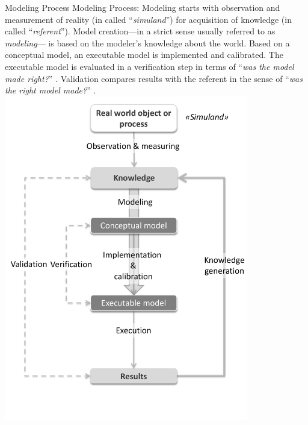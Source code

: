 \createfigure%
{Modeling Process}%
{Modeling Process: Modeling starts with observation and measurement of reality (in \citet[][]{Petty_SokolowskiBanks_2010} called ``\emph{simuland}'') for acquisition of knowledge (in \citet[][]{Petty_SokolowskiBanks_2010} called ``\emph{referent}''). Model creation---in a strict sense usually referred to as \emph{modeling}--- is based on the modeler's knowledge about the world. Based on a conceptual model, an executable model is implemented and calibrated. The executable model is evaluated in a verification step in terms of ``\emph{was the model made right?}'' \citep[][p.332]{Petty_SokolowskiBanks_2010}. Validation compares results with the referent in the sense of ``\emph{was the right model made?}'' \citep[][p.332]{Petty_SokolowskiBanks_2010}.}%
{\label{fig:modeling}}%
{\includegraphics[width=0.8\textwidth, angle=0]{using/figures/modeling.pdf}}%
{}


